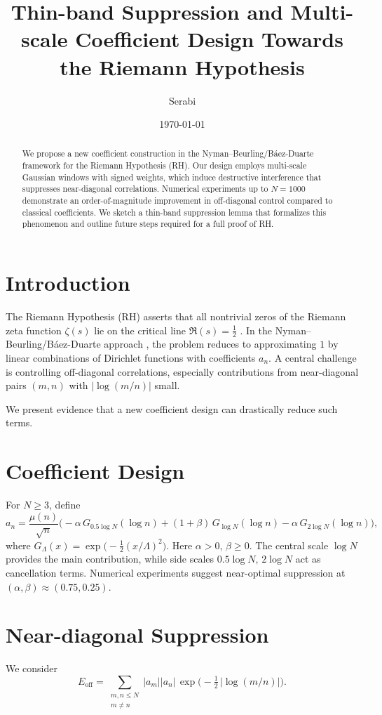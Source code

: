 \documentclass[11pt]{article}
\title{Thin-band Suppression and Multi-scale Coefficient Design Towards the Riemann Hypothesis}
\author{Serabi}
\date{\today}
\theoremstyle{plain}
\begin{document}
\maketitle

\begin{abstract}
We propose a new coefficient construction in the Nyman--Beurling/Báez-Duarte framework for the Riemann Hypothesis (RH).
Our design employs multi-scale Gaussian windows with signed weights, which induce destructive interference that suppresses near-diagonal correlations.
Numerical experiments up to $N=1000$ demonstrate an order-of-magnitude improvement in off-diagonal control compared to classical coefficients.
We sketch a thin-band suppression lemma that formalizes this phenomenon and outline future steps required for a full proof of RH.
\end{abstract}

\section{Introduction}
The Riemann Hypothesis (RH) asserts that all nontrivial zeros of the Riemann zeta function $\zeta(s)$ lie on the critical line $\Re(s)=\tfrac{1}{2}$ \cite{Titchmarsh,Edwards}.
In the Nyman--Beurling/Báez-Duarte approach \cite{Nyman,Beurling,BaezDuarte2003},
the problem reduces to approximating $1$ by linear combinations of Dirichlet functions with coefficients $a_n$.
A central challenge is controlling off-diagonal correlations, especially contributions from near-diagonal pairs $(m,n)$ with $|\log(m/n)|$ small.

We present evidence that a new coefficient design can drastically reduce such terms.

\section{Coefficient Design}
For $N\ge 3$, define
\[
a_n=\frac{\mu(n)}{\sqrt{n}}\Big(-\alpha\,G_{0.5\log N}(\log n)+(1+\beta)\,G_{\log N}(\log n)-\alpha\,G_{2\log N}(\log n)\Big),
\]
where $G_\Lambda(x)=\exp\!\big(-\tfrac12(x/\Lambda)^2\big)$.
Here $\alpha>0$, $\beta\ge0$.
The central scale $\log N$ provides the main contribution, while side scales $0.5\log N,\,2\log N$ act as cancellation terms.
Numerical experiments suggest near-optimal suppression at $(\alpha,\beta)\approx(0.75,0.25)$.

\section{Near-diagonal Suppression}
We consider
\[
E_{\mathrm{off}}=\sum_{\substack{m,n\le N\\ m\ne n}}|a_m||a_n|\,
\exp\!\Big(-\tfrac12\,\big|\log(m/n)\big|\Big).
\]
\end{document}

